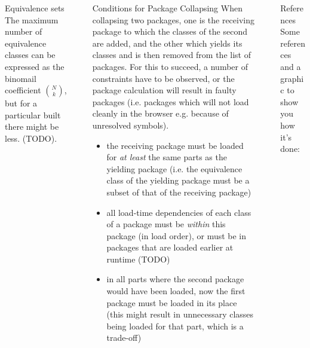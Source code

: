\documentclass[final]{beamer}
\newlength{\sepwid}
\newlength{\onecolwid}
\begin{document}
\begin{frame}[t]
\begin{columns}[t]
\begin{column}{\onecolwid}
\begin{block}{Equivalence sets}
        The maximum number of equivalence classes can be expressed as the
        binomail coefficient ${ {N}\choose{k}}$, but for a particular built
        there might be less.
        (TODO).
      \end{block}

    \end{column}


    \begin{column}{\sepwid}\end{column}			%
    \begin{column}{\onecolwid}
      \begin{block}{Conditions for Package Collapsing}
        When collapsing two packages, one is the receiving package to which the
        classes of the second are added, and the other which yields its classes
        and is then removed from the list of packages. For this to succeed, a
        number of constraints have to be observed, or the package calculation
        will result in faulty packages (i.e. packages which will not load
        cleanly in the browser e.g. because of unresolved symbols).
        \begin{itemize}
          \item the receiving package must be loaded for \textit{at least} the
            same parts as the yielding package (i.e. the equivalence class of
            the yielding package must be a subset of that of the receiving
            package)
          \item all load-time dependencies of each class of a package must be
            \textit{within} this package (in load order), or must be in packages
            that are loaded earlier at runtime (TODO)
          \item in all parts where the second package would have been loaded,
            now the first package must be loaded in its place (this might result
            in unnecessary classes being loaded for that part, which is a
            trade-off)
        \end{itemize}
      \end{block}

    \end{column}


    \begin{column}{\sepwid}\end{column}			%
    \begin{column}{\onecolwid}
      \begin{block}{References}
        Some references and a graphic to show you how it's done:
        

\end{block}
\end{column}
\end{columns}
\end{frame}
\end{document}
